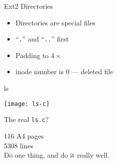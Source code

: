 \begin{frame}{Ext2 Directories}
  \begin{center}
  \end{center}
  \begin{minipage}{.39\textwidth}
    \begin{center}
    \end{center}
  \end{minipage}\quad
  \begin{minipage}{.55\textwidth}
    \begin{itemize}
    \item Directories are special files
    \item ``\texttt{.}'' and ``\texttt{..}'' first
    \item Padding to $4\times{}$
    \item inode number is 0 --- deleted file
    \end{itemize}
  \end{minipage}
\end{frame}

\begin{frame}{\ttfamily ls}
  
  \begin{minipage}{.6\linewidth}
    \texttt{[image: ls-c]}
  \end{minipage}\quad
  \begin{minipage}{.35\linewidth}
    \begin{description}
    \item[The real \texttt{ls.c}?] 
    \end{description}
    \begin{flushright}
      \begin{large}
        116 A4 pages\\
        5308 lines\\[1em]
        Do one thing, and do it really well.\\[2em]
      \end{large}
    \end{flushright}
    {\small {}}
  \end{minipage}  
\end{frame}

